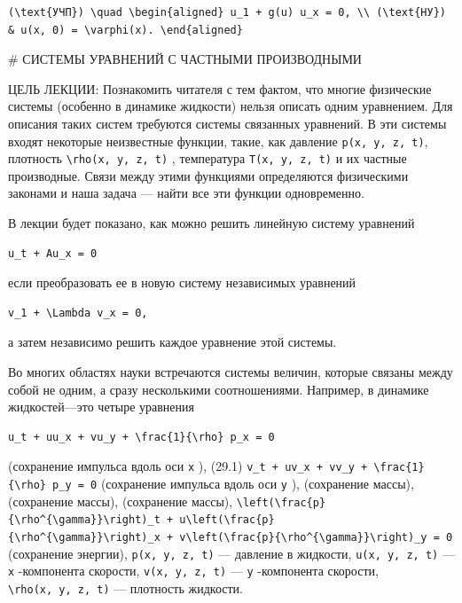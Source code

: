 \documentclass[
  ukrainian,
]{article}
\begin{document}
\begin{verbatim}
(\text{УЧП}) \quad \begin{aligned} u_1 + g(u) u_x = 0, \\ (\text{НУ}) & u(x, 0) = \varphi(x). \end{aligned}
\end{verbatim}

\# СИСТЕМЫ УРАВНЕНИЙ С ЧАСТНЫМИ ПРОИЗВОДНЫМИ

ЦЕЛЬ ЛЕКЦИИ: Познакомить читателя с тем фактом, что многие физические
системы (особенно в динамике жидкости) нельзя описать одним уравнением.
Для описания таких систем требуются системы связанных уравнений. В эти
системы входят некоторые неизвестные функции, такие, как давление
\texttt{p(x,\ y,\ z,\ t)}, плотность
\texttt{\textbackslash{}rho(x,\ y,\ z,\ t)} , температура
\texttt{T(x,\ y,\ z,\ t)} и их частные производные. Связи между этими
функциями определяются физическими законами и наша задача --- найти все
эти функции одновременно.

В лекции будет показано, как можно решить линейную систему уравнений

\begin{verbatim}
u_t + Au_x = 0
\end{verbatim}

если преобразовать ее в новую систему независимых уравнений

\begin{verbatim}
v_1 + \Lambda v_x = 0,
\end{verbatim}

а затем независимо решить каждое уравнение этой системы.

Во многих областях науки встречаются системы величин, которые связаны
между собой не одним, а сразу несколькими соотношениями. Например, в
динамике жидкостей---это четыре уравнения

\begin{verbatim}
u_t + uu_x + vu_y + \frac{1}{\rho} p_x = 0
\end{verbatim}

(сохранение импульса вдоль оси \texttt{x} ), (29.1)
\texttt{v\_t\ +\ uv\_x\ +\ vv\_y\ +\ \textbackslash{}frac\{1\}\{\textbackslash{}rho\}\ p\_y\ =\ 0}
(сохранение импульса вдоль оси \texttt{y} ), (сохранение массы),
(сохранение массы), (сохранение массы),
\texttt{\textbackslash{}left(\textbackslash{}frac\{p\}\{\textbackslash{}rho\^{}\{\textbackslash{}gamma\}\}\textbackslash{}right)\_t\ +\ u\textbackslash{}left(\textbackslash{}frac\{p\}\{\textbackslash{}rho\^{}\{\textbackslash{}gamma\}\}\textbackslash{}right)\_x\ +\ v\textbackslash{}left(\textbackslash{}frac\{p\}\{\textbackslash{}rho\^{}\{\textbackslash{}gamma\}\}\textbackslash{}right)\_y\ =\ 0}
(сохранение энергии), \texttt{p(x,\ y,\ z,\ t)} --- давление в жидкости,
\texttt{u(x,\ y,\ z,\ t)} --- \texttt{x} -компонента скорости,
\texttt{v(x,\ y,\ z,\ t)} --- \texttt{y} -компонента скорости,
\texttt{\textbackslash{}rho(x,\ y,\ z,\ t)} --- плотность жидкости.
\end{document}

